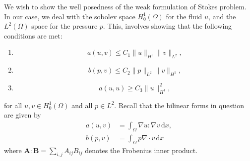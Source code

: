 \documentclass[twocolumn, article]{memoir}
\begin{document}
We wish to show the well posedness of the weak formulation of Stokes problem.
In our case, we deal with the sobolev space \( H^1_0(\Omega) \) for the fluid \( u \),
and the \( L^2(\Omega) \) space for the pressure \( p \).  This, involves showing that
the following conditions are met:
\begin{enumerate}[wide, label=\roman*)]
    \item \begin{equation*}
            a(u, v) \leq C_1 \|u\|_{H^1} \|v\|_{L^2},
    \end{equation*}
    \item \begin{equation*}
            b(p, v) \leq C_2 \|p\|_{L^2} \|v\|_{H^1},
    \end{equation*}
    \item \begin{equation*}
            a(u, u) \geq C_3 \|u\|_{H^1}^2,
    \end{equation*}
\end{enumerate}
for all \( u, v \in H^1_0(\Omega) \) and all \( p \in L^2 \).
Recall that the bilinear forms in question are given by
\begin{align*}
    a(u, v) &= \int_\Omega \nabla u : \nabla v \, \mathrm{d}x,\\
    b(p, v) &= \int_\Omega p \nabla \cdot v \, \mathrm{d}x
\end{align*}
where \( \boldsymbol{A} : \boldsymbol{B} = \sum_{i,j} A_{ij}B_{ij} \) denotes
the Frobenius inner product.
\end{document}
